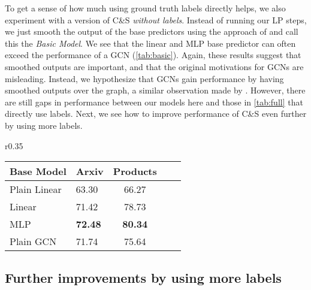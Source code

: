 \documentclass{article}
\begin{document}
To get a sense of how much using ground truth labels directly helps, we also experiment with a version of C\&S \emph{without labels}.
Instead of running our LP steps, we just smooth the output of the base predictors using the approach
of \citet{zhou2004learning} and call this the \emph{Basic Model}.
We see that the linear and MLP base predictor can often exceed the performance of a GCN (\cref{tab:basic}).
Again, these results suggest that smoothed outputs are important, and that the original motivations for GCNs are misleading.
Instead, we hypothesize that GCNs gain performance by having smoothed outputs over the graph, a similar observation
made by \citet{pmlr-v97-wu19e}.
However, there are still gaps in performance between our models here and those in \cref{tab:full} that directly use labels.
Next, we see how to improve performance of C\&S even further by using more labels.
\begin{wraptable}{r}{0.35\linewidth}
\begin{center}
\vspace{-2.5mm}
\label{tab:basic}
\begin{tabular}{llccc}
\toprule
 Base Model   & Arxiv  &Products \\
\midrule
  Plain Linear&  63.30 & 66.27  \\
Linear & 71.42  & 78.73    \\
 MLP & \textbf{72.48} & \textbf{80.34}   \\
Plain GCN & 71.74 &  75.64 \\
\bottomrule
\end{tabular}
\end{center}
\end{wraptable}


\subsection{Further improvements by using more labels}
\end{document}
